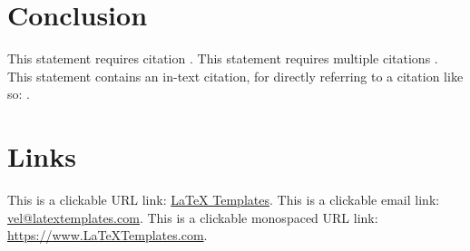 \section{Conclusion}

This statement requires citation \autocite{Futaana2017SolarAtmosphere}. This statement requires multiple citations \autocite{Futaana2017SolarAtmosphere, Afshari2016X-RAYINGMAGNETOTAIL}. This statement contains an in-text citation, for directly referring to a citation like so: \textcite{Futaana2017SolarAtmosphere}.

\section{Links}

This is a clickable URL link: \href{https://www.latextemplates.com}{LaTeX Templates}. This is a clickable email link: \href{mailto:vel@latextemplates.com}{vel@latextemplates.com}. This is a clickable monospaced URL link: \url{https://www.LaTeXTemplates.com}.